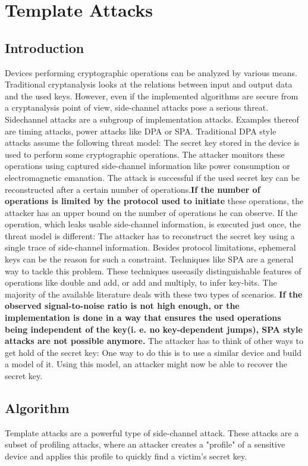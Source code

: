 \documentclass{report}
\begin{document}
\newpage
\section{Template Attacks} 
\subsection{Introduction}
    Devices performing cryptographic operations can be analyzed by various means.
    Traditional cryptanalysis looks at the relations between input and output data and the used keys. However, even if the implemented algorithms are secure from a cryptanalysis point of view, side-channel attacks pose a serious threat. Sidechannel attacks are a subgroup of implementation attacks. Examples thereof are timing attacks, power attacks like DPA or SPA.
    Traditional DPA style attacks assume the following threat model:
    The secret key stored in the device is used to perform some cryptographic operations. The attacker monitors these operations using captured side-channel information like power consumption or electromagnetic emanation. The attack is successful if the used secret key can be reconstructed after a certain number of operations.\textbf{If the number of operations is limited by the protocol used to initiate} these operations, the attacker has an upper bound on the number of operations he can observe. If the operation, which leaks usable side-channel information, is executed just once, the threat model is different: The attacker has to reconstruct the secret
    key using a single trace of side-channel information. Besides protocol limitations, ephemeral keys can be the reason for such a constraint. Techniques like SPA are a general way to tackle this problem. These techniques useeasily distinguishable features of operations like double and add, or add and multiply, to infer key-bits. The majority of the available literature deals with these two types of scenarios. \textbf{If the observed signal-to-noise ratio is not high enough, or the implementation is done in a way that ensures the used operations being independent of the key(i. e. no key-dependent jumps), SPA style attacks are not possible anymore.} The attacker has to think of other ways to get hold of the secret key: One way to do this is to use a similar device and build a model of it. Using this
    model, an attacker might now be able to recover the secret key.
    
\subsection{Algorithm}
    Template attacks are a powerful type of side-channel attack. These attacks are a subset of profiling attacks, where an attacker creates a "profile" of a sensitive device and applies this profile to quickly find a victim's secret key.
    
\end{document}
